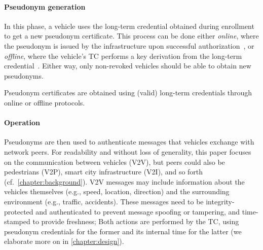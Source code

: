 \paragraph{Pseudonym generation} 

In this phase, a vehicle uses the long-term credential obtained during
enrollment to get a new pseudonym certificate. This process can be done either
\emph{online}, where the pseudonym is issued by the infrastructure upon
successful authorization~\cite{etsi2022102941,brecht2018scms}, or
\emph{offline}, where the vehicle's \ac{TC} performs a key derivation from the
long-term credential~\cite{whitefield2017privacy,desmoulins2019practical}.
Either way, only non-revoked vehicles should be able to obtain new pseudonyms.
%
\begin{req}
    \label{req:pseudonym}
    Pseudonym certificates are obtained using (valid) long-term credentials
    through online or offline protocols. 
\end{req}
%
\paragraph{Operation} 

Pseudonyms are then used to authenticate messages that vehicles exchange with
network peers. For readability and without loss of generality, this paper
focuses on the communication between vehicles (\ac{V2V}), but peers could also
be pedestrians (V2P), smart city infrastructure (V2I), and so forth
(cf.~\cref{chapter:background}). \ac{V2V} messages may include information about
the vehicles themselves (e.g., speed, location, direction) and the surrounding
environment (e.g., traffic, accidents). These messages need to be
integrity-protected and authenticated to prevent message spoofing or tampering,
and time-stamped to provide freshness; Both actions are performed by the
\ac{TC}, using pseudonym credentials for the former and its internal time
\funcnow{} for the latter (we elaborate more on \funcnow{} in
\cref{chapter:design}).

